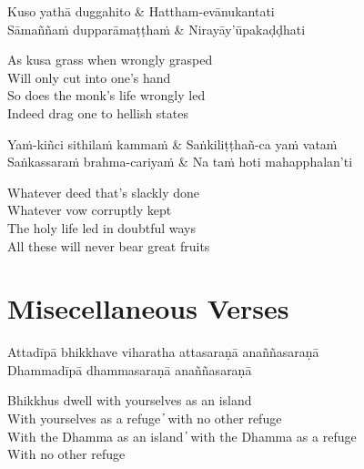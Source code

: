 \begin{twochants}
  Kuso yathā duggahito & Hattham-evānukantati\\
  Sāmaññaṁ dupparāmaṭṭhaṁ & Nirayāy’ūpakaḍḍhati\\
\end{twochants}

\begin{english}
  As kusa grass when wrongly grasped\\
  Will only cut into one’s hand\\
  So does the monk’s life wrongly led\\
  Indeed drag one to hellish states
\end{english}

\begin{twochants}
  Yaṁ-kiñci sithilaṁ kammaṁ & Saṅkiliṭṭhañ-ca yaṁ vataṁ\\
  Saṅkassaraṁ brahma-cariyaṁ & Na taṁ hoti mahapphalan’ti\\
\end{twochants}

\begin{english}
  Whatever deed that’s slackly done\\
  Whatever vow corruptly kept\\
  The holy life led in doubtful ways\\
  All these will never bear great fruits
\end{english}


\clearpage

\section{Misecellaneous Verses}

\begin{leader}
\end{leader}

\begin{twochants}
  Attadīpā bhikkhave viharatha attasaraṇā anaññasaraṇā\\
  Dhammadīpā dhammasaraṇā anaññasaraṇā\\
\end{twochants}

\begin{english}
  Bhikkhus dwell with yourselves as an island\\
  With yourselves as a refuge  ̓  with no other refuge\\
  With the Dhamma as an island  ̓  with the Dhamma as a refuge\\
  With no other refuge
\end{english}

